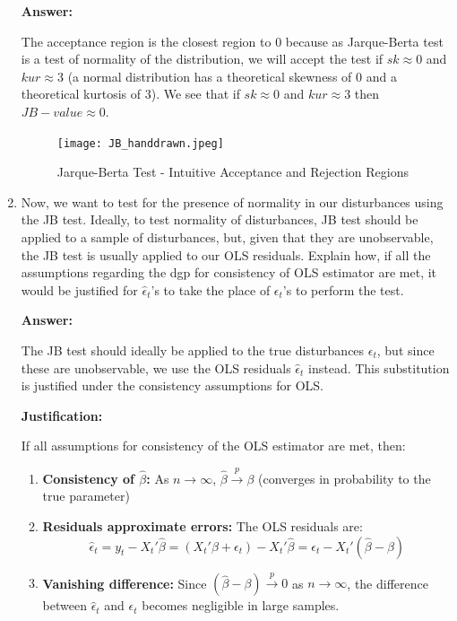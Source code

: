 \documentclass[12pt,a4paper]{article}
\begin{document}
\begin{enumerate}[label=(\alph*)]
    \textbf{Answer:}

The acceptance region is the closest region to 0 because as Jarque-Berta test is a test of normality of the distribution, we will accept the test if $sk \approx 0 $ and $kur \approx 3$ (a normal distribution has a theoretical skewness of 0 and a theoretical kurtosis of 3). We see that if $sk \approx 0 $ and $kur \approx 3$ then $JB-value \approx 0$.

\begin{figure}[H]
  \centering
  \texttt{[image: JB\_handdrawn.jpeg]}
  \caption{Jarque-Berta Test - Intuitive Acceptance and Rejection Regions}
\end{figure}


  
  \item Now, we want to test for the presence of normality in our disturbances using the JB test. Ideally, to test normality of disturbances, JB test should be applied to a sample of disturbances, but, given that they are unobservable, the JB test is usually applied to our OLS residuals. Explain how, if all the assumptions regarding the dgp for consistency of OLS estimator are met, it would be justified for $\hat{\epsilon}_t$'s to take the place of $\epsilon_t$'s to perform the test.
  
  \textbf{Answer:}

The JB test should ideally be applied to the true disturbances $\epsilon_t$, but since these are unobservable, we use the OLS residuals $\hat{\epsilon}_t$ instead. This substitution is justified under the consistency assumptions for OLS.

\textbf{Justification:}

If all assumptions for consistency of the OLS estimator are met, then:

\begin{enumerate}
\item \textbf{Consistency of $\hat{\beta}$:} As $n \to \infty$, $\hat{\beta} \xrightarrow{p} \beta$ (converges in probability to the true parameter)

\item \textbf{Residuals approximate errors:} The OLS residuals are:
$$\hat{\epsilon}_t = y_t - X_t'\hat{\beta} = (X_t'\beta + \epsilon_t) - X_t'\hat{\beta} = \epsilon_t - X_t'(\hat{\beta} - \beta)$$

\item \textbf{Vanishing difference:} Since $(\hat{\beta} - \beta) \xrightarrow{p} 0$ as $n \to \infty$, the difference between $\hat{\epsilon}_t$ and $\epsilon_t$ becomes negligible in large samples.


\end{enumerate}
\end{enumerate}
\end{document}
